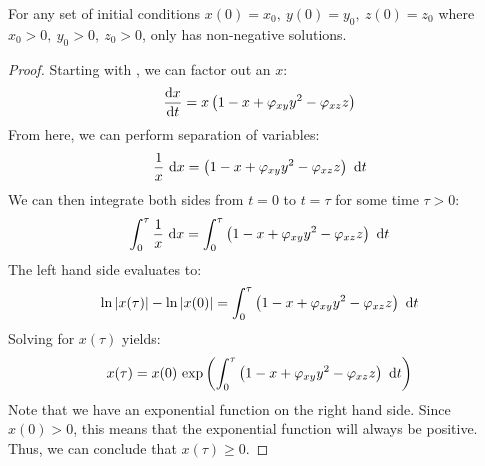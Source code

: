 \begin{theorem}\label{thm:positiveness}
    For any set of initial conditions $x(0)=x_0,\ y(0)=y_0,\ z(0)=z_0$ where $x_0>0,\ y_0>0,\ z_0>0$,  only has non-negative solutions.
\end{theorem}
\begin{proof}
    Starting with , we can factor out an $x$:
    \begin{equation*}
        \diff[]{x}{t}=x\left(1-x+\varphi_{xy}y^2-\varphi_{xz}z\right)
    \end{equation*}
    From here, we can perform separation of variables:
    \begin{equation*}
        \frac{1}{x}\ \opdiff{x}=\left(1-x+\varphi_{xy}y^2-\varphi_{xz}z\right)\ \opdiff{t}
    \end{equation*}
    We can then integrate both sides from $t=0$ to $t=\tau$ for some time $\tau>0$:
    \begin{equation*}
        \int_0^\tau\frac{1}{x}\ \opdiff{x}=\int_0^\tau\left(1-x+\varphi_{xy}y^2-\varphi_{xz}z\right)\ \opdiff{t}
    \end{equation*}
    The left hand side evaluates to:
    \begin{equation*}
        \ln{x(\tau)}-\ln{x(0)}=\int_0^\tau\left(1-x+\varphi_{xy}y^2-\varphi_{xz}z\right)\ \opdiff{t}
    \end{equation*}
    Solving for $x(\tau)$ yields:
    \begin{equation*}
        x(\tau) = x(0)\ \text{exp}\left( \int_0^\tau \left(1-x+\varphi_{xy}y^2-\varphi_{xz}z\right)\ \mathrm{d}t \right)
    \end{equation*}
    Note that we have an exponential function on the right hand side.
    Since $x(0) > 0$, this means that the exponential function will always be positive.
    Thus, we can conclude that $x(\tau) \geq 0$.

\end{proof}
